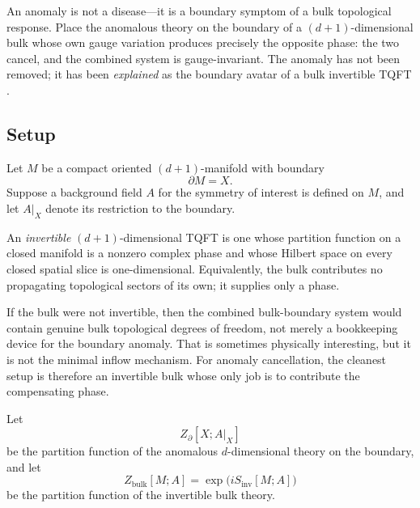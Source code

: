 An anomaly is not a disease---it is a boundary symptom of a bulk topological response.  Place the anomalous theory on the boundary of a $(d+1)$-dimensional bulk whose own gauge variation produces precisely the opposite phase: the two cancel, and the combined system is gauge-invariant.  The anomaly has not been removed; it has been \emph{explained} as the boundary avatar of a bulk invertible TQFT \cite{CallanHarvey1985,Freed1995CSnotes,FreedMooreTeleman2024}.

\subsection{Setup}

\begin{assumption}\label{ass:inflow-setup}
Let $M$ be a compact oriented $(d+1)$-manifold with boundary
\begin{equation*}
\partial M = X.
\end{equation*}
Suppose a background field $A$ for the symmetry of interest is defined on $M$, and let $A|_X$ denote its restriction to the boundary.
\end{assumption}

\begin{definition}\label{def:invertible-bulk}
An \emph{invertible} $(d+1)$-dimensional TQFT is one whose partition function on a closed manifold is a nonzero complex phase and whose Hilbert space on every closed spatial slice is one-dimensional. Equivalently, the bulk contributes no propagating topological sectors of its own; it supplies only a phase.
\end{definition}

\begin{remark}\label{rem:invertible-why}
If the bulk were not invertible, then the combined bulk-boundary system would contain genuine bulk topological degrees of freedom, not merely a bookkeeping device for the boundary anomaly. That is sometimes physically interesting, but it is not the minimal inflow mechanism. For anomaly cancellation, the cleanest setup is therefore an invertible bulk whose only job is to contribute the compensating phase.
\end{remark}

\noindent Let
\begin{equation*}
Z_{\partial}[X;A|_X]
\end{equation*}
be the partition function of the anomalous $d$-dimensional theory on the boundary, and let
\begin{equation*}
Z_{\mathrm{bulk}}[M;A]
=
\exp\!\bigl(iS_{\mathrm{inv}}[M;A]\bigr)
\end{equation*}
be the partition function of the invertible bulk theory.

